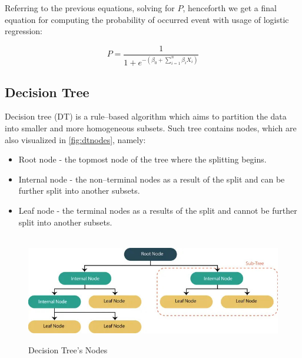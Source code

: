 Referring to the previous equations, solving for $P$, henceforth we get a final equation for computing the probability of occurred event with usage of logistic regression:

\begin{equation}\label{eq}
P = \frac{1}{1+e^{-\left(\beta_0 + \displaystyle\sum_{i=1}^{n} \beta_i X_i\right)}}
\end{equation}

\subsection{Decision Tree}
\label{subsec:dt}

Decision tree (DT) is a rule--based algorithm which aims to partition the data into smaller and more homogeneous subsets. Such tree contains nodes, which are also visualized in \autoref{fig:dtnodes}, namely:
\begin{itemize}\setlength\itemsep{0em}
	\item Root node - the topmost node of the tree where the splitting begins.
	\item Internal node - the non--terminal nodes as a result of the split and can be further split into another subsets.
	\item Leaf node - the terminal nodes as a results of the split and cannot be further split into another subsets.
\end{itemize}
\begin{figure}[H]
    \centering
    \caption{Decision Tree's Nodes}\vspace{0.5em}
    \label{fig:dtnodes}\
    \includegraphics[width=130mm]{Figures/dtnodes.jpg}
    \vspace{-1em}
\end{figure}

